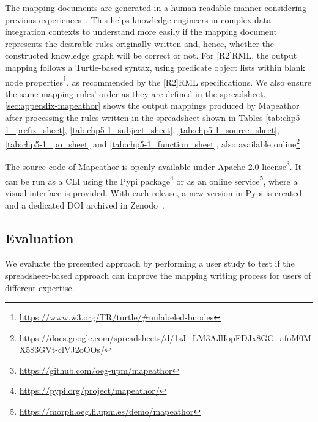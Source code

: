 The mapping documents are generated in a human-readable manner considering previous experiences~\citep{chaves2022systematic,corcho2021high,chaves2020bench}.
This helps knowledge engineers in complex data integration contexts to understand more easily if the mapping document represents the desirable rules originally written and, hence, whether the constructed knowledge graph will be correct or not. 
For [R2]RML, the output mapping follows a Turtle-based syntax, using predicate object lists within blank node properties\footnote{\url{https://www.w3.org/TR/turtle/\#unlabeled-bnodes}}, as recommended by the [R2]RML specifications.
We also ensure the same mapping rules' order as they are defined in the spreadsheet.
\cref{sec:appendix-mapeathor} shows the output mappings produced by Mapeathor after processing the rules written in the spreadsheet shown in Tables \ref{tab:chp5-1_prefix_sheet}, \ref{tab:chp5-1_subject_sheet}, \ref{tab:chp5-1_source_sheet}, \ref{tab:chp5-1_po_sheet} and \ref{tab:chp5-1_function_sheet}, also available online\footnote{\url{https://docs.google.com/spreadsheets/d/1sJ_LM3AJlIopFDJx8GC_afoM0MX583GVt-clVJ2oOOs/}}




The source code of Mapeathor is openly available under Apache 2.0 license\footnote{\url{https://github.com/oeg-upm/mapeathor}}. It can be run as a CLI using the Pypi package\footnote{\url{https://pypi.org/project/mapeathor/}} or as an online service\footnote{\url{https://morph.oeg.fi.upm.es/demo/mapeathor}}, where a visual interface is provided. With each release, a new version in Pypi is created and a dedicated DOI archived in Zenodo~\citep{iglesias-molina_2023_5973906}. 




\subsection{Evaluation}
We evaluate the presented approach by performing a user study to test %
if the spreadsheet-based approach can improve the mapping writing process for users of different expertise. 

